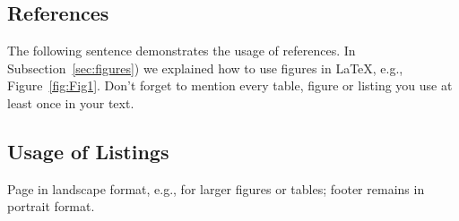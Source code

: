\subsection{References}

The following sentence demonstrates the usage of references. In Subsection~\ref{sec:figures}) we explained how to use figures in \LaTeX, e.g., Figure~\ref{fig:Fig1}. Don't forget to mention every table, figure or listing you use at least once in your text.

\subsection{Usage of Listings}

\lstset{language=JAVA, breaklines=true, tabsize=2}




\begin{landscape}

Page in landscape format, e.g., for larger figures or tables; footer remains in portrait format.
\end{landscape}




